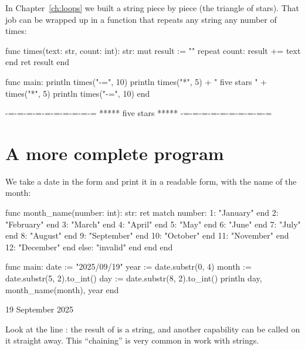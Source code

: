 In Chapter~\ref{ch:loops} we built a string piece by piece (the triangle of
stars). That job can be wrapped up in a function that repeats any string any
number of times:

\begin{salamcode}
func times(text: str, count: int): str:
    mut result := ""
    repeat count:
        result += text
    end
    ret result
end

func main:
    println times("-=", 10)
    println times("*", 5) + " five stars " + times("*", 5)
    println times("-=", 10)
end
\end{salamcode}

\begin{salamout}
-=-=-=-=-=-=-=-=-=-=
***** five stars *****
-=-=-=-=-=-=-=-=-=-=
\end{salamout}

\section{A more complete program}

We take a date in the form  and print it in a readable
form, with the name of the month:

\begin{salamcode}
func month_name(number: int): str:
    ret match number:
        1: "January" end
        2: "February" end
        3: "March" end
        4: "April" end
        5: "May" end
        6: "June" end
        7: "July" end
        8: "August" end
        9: "September" end
        10: "October" end
        11: "November" end
        12: "December" end
        else: "invalid" end
    end
end

func main:
    date := "2025/09/19"
    year := date.substr(0, 4)
    month := date.substr(5, 2).to_int()
    day := date.substr(8, 2).to_int()
    println day, month_name(month), year
end
\end{salamcode}

\begin{salamout}
19 September 2025
\end{salamout}

Look at the line : the result of
 is a string, and another capability can be called on it
straight away. This ``chaining'' is very common in work with strings.


